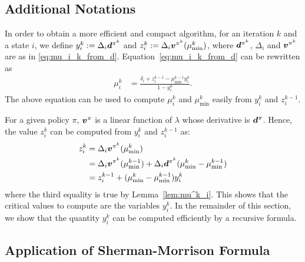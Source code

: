 \documentclass[acmsmall,screen,anonymous]{acmart}
\begin{document}
\subsection{Additional Notations}

In order to obtain a more efficient and compact algorithm, for an iteration $k$ and a state $i$, we define $y^k_i:=\Delta_{i}\boldsymbol{d}^{\pi^k}$ and $z^k_i:=\Delta_{i}\boldsymbol{v}^{\pi^k}(\mu^k_{\min})$, where $\boldsymbol{d}^{\pi^k}$, $\Delta_i$ and $\boldsymbol{v}^{\pi^k}$ are as in \eqref{eq:mu_i_k_from_d}. Equation~\eqref{eq:mu_i_k_from_d} can be rewritten as
\begin{align}
    \mu_i^k &= \displaystyle\frac{\delta_i +z_i^{k-1}-\mu^{k-1}_{\min}y^k_i}{1-y_i^k}.
    \label{eq:mu^k_i_from_y}
\end{align}
The above equation can be used to compute $\mu_i^k$ and $\mu^k_{\min}$ easily from $y^k_i$ and $z^{k-1}_i$. 

For a given policy $\pi$, $\boldsymbol{v}^\pi$ is a linear function of $\lambda$ whose derivative is $\boldsymbol{d}^\pi$. Hence, the value $z^k_i$ can be computed from $y^k_i$ and $z^{k-1}_i$ as:
\begin{align}
    z^k_i &= \Delta_{i}\boldsymbol{v}^{\pi^k}(\mu^k_{\min}) \nonumber\\
    &= \Delta_{i}\boldsymbol{v}^{\pi^k}(\mu^{k-1}_{\min}) + \Delta_{i}\boldsymbol{d}^{\pi^k}(\mu^k_{\min} - \mu^{k-1}_{\min})\nonumber\\
    &= z_i^{k-1} +(\mu^k_{\min}-\mu^{k-1}_{\min})y_i^k\label{eq:z^k+1-i}
\end{align}
where the third equality is true by Lemma~\ref{lem:mu^k_i}.
This shows that the critical values to compute are the variables $y^k_i$. In the remainder of this section, we show that the quantity $y^k_i$ can be computed efficiently by a recursive formula.



\subsection{Application of Sherman-Morrison Formula}
\label{ssec:sm_form}
\end{document}
